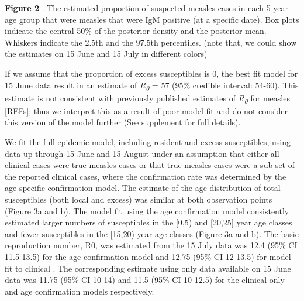 \textbf{Figure 2} . The estimated proportion of suspected measles cases
in each 5 year age group that were measles that were IgM positive (at a
specific date). Box plots indicate the central 50\% of the posterior
density and the posterior mean. Whiskers indicate the 2.5th and the
97.5th percentiles. (note that, we could show the estimates on 15 June
and 15 July in different colors)

If we assume that the proportion of excess susceptibles is 0, the best
fit model for 15 June data result in an estimate of
\emph{R\textsubscript{0}} = 57 (95\% credible interval: 54-60). This
estimate is not consistent with previously published estimates of
\emph{R\textsubscript{0}} for measles {[}REFs{]}; thus we interpret this
as a result of poor model fit and do not consider this version of the
model further (See supplement for full details).

We fit the full epidemic model, including resident and excess
susceptibles, using data up through 15 June and 15 August under an
assumption that either all clinical cases were true measles cases or
that true measles cases were a sub-set of the reported clinical cases,
where the confirmation rate was determined by the age-specific
confirmation model. The estimate of the age distribution of total
susceptibles (both local and excess) was similar at both observation
points (Figure 3a and b). The model fit using the age confirmation model
consistently estimated larger numbers of susceptibles in the {[}0,5) and
{[}20,25{]} year age classes and fewer susceptibles in the {[}15,20)
year age classes (Figure 3a and b). The basic reproduction number, R0,
was estimated from the 15 July data was 12.4 (95\% CI 11.5-13.5) for the
age confirmation model and 12.75 (95\% CI 12-13.5) for model fit to
clinical . The corresponding estimate using only data available on 15
June data was 11.75 (95\% CI 10-14) and 11.5 (95\% CI 10-12.5) for the
clinical only and age confirmation models respectively.
